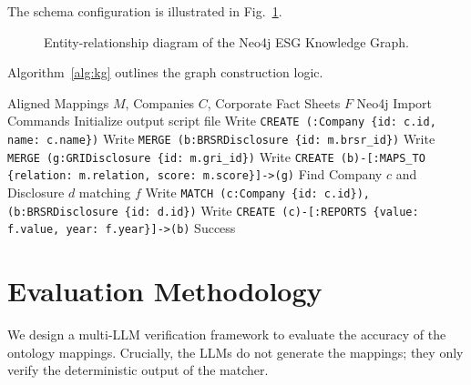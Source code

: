 \documentclass[journal,compsoc]{IEEEtran}
\begin{document}
The schema configuration is illustrated in Fig.~\ref{fig:kg}.

\begin{figure}[h]
\centering
{}
\caption{Entity-relationship diagram of the Neo4j ESG Knowledge Graph.}
\label{fig:kg}
\end{figure}

Algorithm~\ref{alg:kg} outlines the graph construction logic.

\begin{algorithm}
\caption{ESG Knowledge Graph Construction}
\label{alg:kg}
\begin{algorithmic}[1]
\REQUIRE Aligned Mappings $M$, Companies $C$, Corporate Fact Sheets $F$
\ENSURE Neo4j Import Commands
\STATE Initialize output script file
    \STATE Write \texttt{CREATE (:Company \{id: c.id, name: c.name\})}
\ENDFOR
{}
    \STATE Write \texttt{MERGE (b:BRSRDisclosure \{id: m.brsr\_id\})}
    \STATE Write \texttt{MERGE (g:GRIDisclosure \{id: m.gri\_id\})}
    \STATE Write \texttt{CREATE (b)-[:MAPS\_TO \{relation: m.relation, score: m.score\}]->(g)}
\ENDFOR
{}
    \STATE Find Company $c$ and Disclosure $d$ matching $f$
    \STATE Write \texttt{MATCH (c:Company \{id: c.id\}), (b:BRSRDisclosure \{id: d.id\})}
    \STATE Write \texttt{CREATE (c)-[:REPORTS \{value: f.value, year: f.year\}]->(b)}
\ENDFOR
\RETURN Success
\end{algorithmic}
\end{algorithm}

\section{Evaluation Methodology}
We design a multi-LLM verification framework to evaluate the accuracy of the ontology mappings. Crucially, the LLMs do not generate the mappings; they only verify the deterministic output of the matcher.
\end{document}
